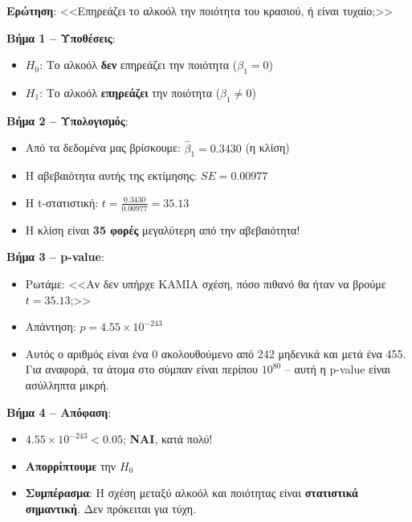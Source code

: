 \documentclass[12pt,a4paper]{article}
\begin{document}
\begin{examplebox}
\textbf{Ερώτηση}: <<Επηρεάζει το αλκοόλ την ποιότητα του κρασιού, ή είναι τυχαίο;>>

\textbf{Βήμα 1 -- Υποθέσεις}:
\begin{itemize}
    \item $H_0$: Το αλκοόλ \textbf{δεν} επηρεάζει την ποιότητα ($\beta_1 = 0$)
    \item $H_1$: Το αλκοόλ \textbf{επηρεάζει} την ποιότητα ($\beta_1 \neq 0$)
\end{itemize}

\textbf{Βήμα 2 -- Υπολογισμός}:
\begin{itemize}
    \item Από τα δεδομένα μας βρίσκουμε: $\hat{\beta}_1 = 0.3430$ (η κλίση)
    \item Η αβεβαιότητα αυτής της εκτίμησης: $SE = 0.00977$
    \item Η t-στατιστική: $t = \frac{0.3430}{0.00977} = 35.13$
    \item Η κλίση είναι \textbf{35 φορές} μεγαλύτερη από την αβεβαιότητα!
\end{itemize}

\textbf{Βήμα 3 -- p-value}:
\begin{itemize}
    \item Ρωτάμε: <<Αν δεν υπήρχε ΚΑΜΙΑ σχέση, πόσο πιθανό θα ήταν να βρούμε $t = 35.13$;>>
    \item Απάντηση: $p = 4.55 \times 10^{-243}$
    \item Αυτός ο αριθμός είναι ένα 0 ακολουθούμενο από 242 μηδενικά και μετά ένα 455. Για αναφορά, τα άτομα στο σύμπαν είναι περίπου $10^{80}$ -- αυτή η p-value είναι ασύλληπτα μικρή.
\end{itemize}

\textbf{Βήμα 4 -- Απόφαση}:
\begin{itemize}
    \item $4.55 \times 10^{-243} < 0.05$; \textbf{ΝΑΙ}, κατά πολύ!
    \item \textbf{Απορρίπτουμε} την $H_0$
    \item \textbf{Συμπέρασμα}: Η σχέση μεταξύ αλκοόλ και ποιότητας είναι \textbf{στατιστικά σημαντική}. Δεν πρόκειται για τύχη.
\end{itemize}
\end{examplebox}
\end{document}
